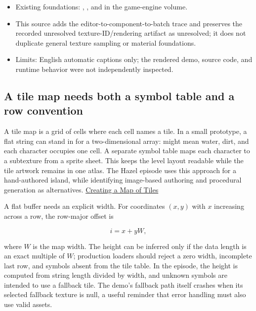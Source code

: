 \begin{itemize}
\tightlist
\item
  Existing foundations: , , and  in the game-engine volume.
\item
  This source adds the editor-to-component-to-batch trace and preserves the recorded unresolved texture-ID/rendering artifact as unresolved; it does not duplicate general texture sampling or material foundations.
\item
  Limits: English automatic captions only; the rendered demo, source code, and runtime behavior were not independently inspected.
\end{itemize}

\subsection{A tile map needs both a symbol table and a row convention}\label{06-engine-ii-ch026-a-tile-map-needs-both-a-symbol-table-and-a-row-convention}

\hypertarget{06-engine-ii-ch026-a-tile-map-needs-both-a-symbol-table-and-a-row-convention}{}

A tile map is a grid of cells where each cell names a tile. In a small prototype, a flat string can stand in for a two-dimensional array:  might mean water,  dirt, and each character occupies one cell. A separate symbol table maps each character to a subtexture from a sprite sheet. This keeps the level layout readable while the tile artwork remains in one atlas. The Hazel episode uses this approach for a hand-authored island, while identifying image-based authoring and procedural generation as alternatives. \href{https://www.youtube.com/watch?v=mj7qCwHTtK8}{Creating a Map of Tiles}

A flat buffer needs an explicit width. For coordinates \((x,y)\) with \(x\) increasing across a row, the row-major offset is

\[
 i = x + yW,
\]

where \(W\) is the map width. The height can be inferred only if the data length is an exact multiple of \(W\); production loaders should reject a zero width, incomplete last row, and symbols absent from the tile table. In the episode, the height is computed from string length divided by width, and unknown symbols are intended to use a fallback tile. The demo's fallback path itself crashes when its selected fallback texture is null, a useful reminder that error handling must also use valid assets.

